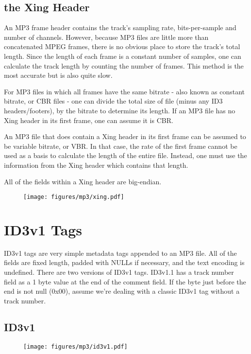 \clearpage

\subsection{the Xing Header}

An MP3 frame header contains the track's sampling rate,
bits-per-sample and number of channels.
However, because MP3 files are little more than
concatenated MPEG frames, there is no obvious place to
store the track's total length.
Since the length of each frame is a constant number of samples,
one can calculate the track length by counting the number of frames.
This method is the most accurate but is also quite slow.

For MP3 files in which all frames have the same bitrate
- also known as constant bitrate, or CBR files -
one can divide the total size of file (minus any ID3 headers/footers),
by the bitrate to determine its length.
If an MP3 file has no Xing header in its first frame,
one can assume it is CBR.

An MP3 file that does contain a Xing header in its first frame
can be assumed to be variable bitrate, or VBR.
In that case, the rate of the first frame cannot be used as a
basis to calculate the length of the entire file.
Instead, one must use the information from the Xing header
which contains that length.

All of the fields within a Xing header are big-endian.
\begin{figure}[h]
\texttt{[image: figures/mp3/xing.pdf]}
\end{figure}

\clearpage

\section{ID3v1 Tags}
ID3v1 tags are very simple metadata tags appended to an MP3 file.
All of the fields are fixed length, padded with NULLs if necessary,
and the text encoding is undefined.
There are two versions of ID3v1 tags.
ID3v1.1 has a track number field as a 1 byte value
at the end of the comment field.
If the byte just before the end is not null (0x00),
assume we're dealing with a classic ID3v1 tag without a
track number.

\subsection{ID3v1}

\begin{figure}[h]
\texttt{[image: figures/mp3/id3v1.pdf]}
\end{figure}

